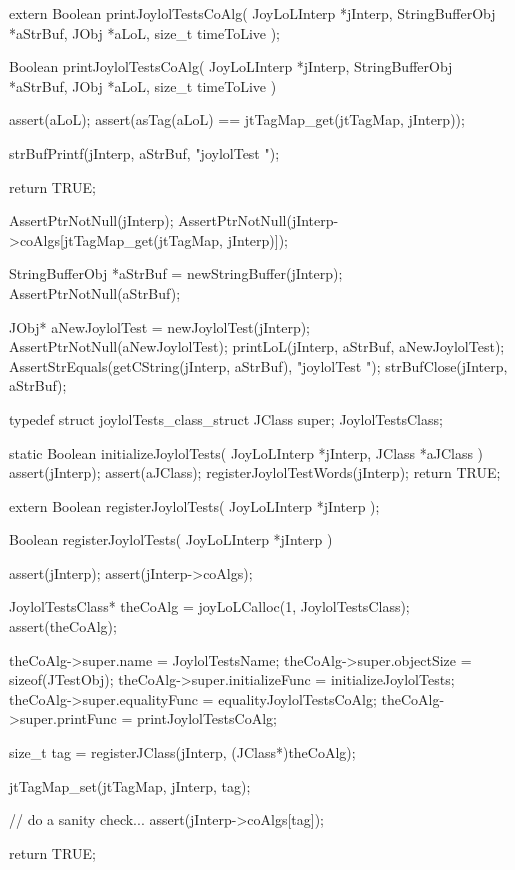 
\startCHeader
extern Boolean printJoylolTestsCoAlg(
  JoyLoLInterp    *jInterp,
  StringBufferObj *aStrBuf,
  JObj            *aLoL,
  size_t           timeToLive
);
\stopCHeader
{}

\startCCode
Boolean printJoylolTestsCoAlg(
  JoyLoLInterp    *jInterp,
  StringBufferObj *aStrBuf,
  JObj            *aLoL,
  size_t           timeToLive
) {
  assert(aLoL);
  assert(asTag(aLoL) == jtTagMap_get(jtTagMap, jInterp));

  strBufPrintf(jInterp, aStrBuf, "joylolTest ");
  
  return TRUE;
}
\stopCCode


\startCTest
  AssertPtrNotNull(jInterp);
  AssertPtrNotNull(jInterp->coAlgs[jtTagMap_get(jtTagMap, jInterp)]);

  StringBufferObj *aStrBuf = newStringBuffer(jInterp);
  AssertPtrNotNull(aStrBuf);
  
  JObj* aNewJoylolTest = newJoylolTest(jInterp);
  AssertPtrNotNull(aNewJoylolTest);
  printLoL(jInterp, aStrBuf, aNewJoylolTest);
  AssertStrEquals(getCString(jInterp, aStrBuf), "joylolTest ");
  strBufClose(jInterp, aStrBuf);
\stopCTest
\stopTestCase
\stopTestSuite

\startTestSuite[registerJoylolTests]

\startCHeader
typedef struct joylolTests_class_struct {
  JClass         super;
} JoylolTestsClass;

\stopCHeader

\startCCode
static Boolean initializeJoylolTests(
  JoyLoLInterp *jInterp,
  JClass       *aJClass
) {
  assert(jInterp);
  assert(aJClass);
  registerJoylolTestWords(jInterp);
  return TRUE;
}
\stopCCode

\startCHeader
extern Boolean registerJoylolTests(
  JoyLoLInterp *jInterp
);
\stopCHeader
{}

\startCCode
Boolean registerJoylolTests(
  JoyLoLInterp *jInterp
) {
  assert(jInterp);
  assert(jInterp->coAlgs);
  
  JoylolTestsClass* theCoAlg
    = joyLoLCalloc(1, JoylolTestsClass);
  assert(theCoAlg);
  
  theCoAlg->super.name           = JoylolTestsName;
  theCoAlg->super.objectSize     = sizeof(JTestObj);
  theCoAlg->super.initializeFunc = initializeJoylolTests;
  theCoAlg->super.equalityFunc   = equalityJoylolTestsCoAlg;
  theCoAlg->super.printFunc      = printJoylolTestsCoAlg;
  
  size_t tag =
    registerJClass(jInterp, (JClass*)theCoAlg);
  
  jtTagMap_set(jtTagMap, jInterp, tag);
  
  // do a sanity check...
  assert(jInterp->coAlgs[tag]);
   
  return TRUE;
}
\stopCCode

